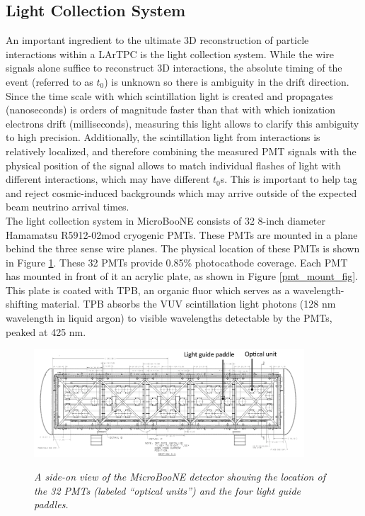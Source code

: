 \subsection{Light Collection System}
An important ingredient to the ultimate 3D reconstruction of particle interactions within a LArTPC is the light collection system. While the wire signals alone suffice to reconstruct 3D interactions, the absolute timing of the event (referred to as $t_0$) is unknown so there is ambiguity in the drift direction. Since the time scale with which scintillation light is created and propagates (nanoseconds) is orders of magnitude faster than that with which ionization electrons drift (milliseconds), measuring this light allows to clarify this ambiguity to high precision. Additionally, the scintillation light from interactions is relatively localized, and therefore combining the measured PMT signals with the physical position of the signal allows to match individual flashes of light with different interactions, which may have different $t_0$s. This is important to help tag and reject cosmic-induced backgrounds which may arrive outside of the expected beam neutrino arrival times.\\

The light collection system in MicroBooNE consists of 32 8-inch diameter Hamamatsu R5912-02mod cryogenic PMTs. These PMTs are mounted in a plane behind the three sense wire planes. The physical location of these PMTs is shown in Figure \ref{pmt_placement_fig}. These 32 PMTs provide 0.85\% photocathode coverage. Each PMT has mounted in front of it an acrylic plate, as shown in Figure \ref{pmt_mount_fig}. This plate is coated with TPB, an organic fluor which serves as a wavelength-shifting material. TPB absorbs the VUV scintillation light photons (128 nm wavelength in liquid argon) to visible wavelengths detectable by the PMTs, peaked at 425 nm.

\begin{figure}[ht!]
\centering
	\includegraphics[width=0.9\textwidth]{Figures/pmt_placement.png} \\
\caption{\textit{A side-on view of the MicroBooNE detector showing the location of the 32 PMTs (labeled ``optical units'') and the four light guide paddles.}}\label{pmt_placement_fig}
\end{figure}


